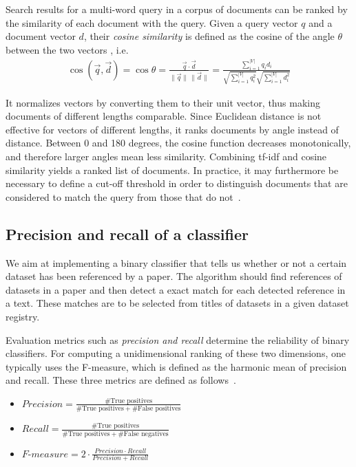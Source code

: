 \documentclass{IOS-Book-Article}
\begin{document}
Search results for a multi-word query in a corpus of documents can be ranked by the similarity of each document with the query.
Given a query vector $q$ and a document vector $d$, their \emph{cosine similarity} is defined as the cosine of the angle $\theta$ between the two vectors \citep{SALTON1988,ChristopherD1999}, i.e.\
\begin{align*}
  \cos(\overrightarrow{q},\overrightarrow{d})=\cos \theta=\frac{\overrightarrow{q}\cdot \overrightarrow{d}}{\|\overrightarrow{q}\|\,\|\overrightarrow{d}\|}=
  \frac{\sum_{i=1}^{|V|} q_id_i}{\sqrt{\sum_{i=1}^{|V|} q_i^2}\sqrt{\sum_{i=1}^{|V|} d_i^2}}
\end{align*}

It normalizes vectors by converting them to their unit vector, thus making documents of different lengths comparable.
Since Euclidean distance is not effective for vectors of different lengths, it ranks documents by angle instead of distance.
Between 0 and 180 degrees, the cosine function decreases monotonically, and therefore larger angles mean less similarity.
Combining tf-idf and cosine similarity yields a ranked list of documents.
In practice, it may furthermore be necessary to define a cut-off threshold in order to distinguish documents that are considered to match the query from those that do not~\citep{Joachims1997}.

\subsection{Precision and recall of a classifier}
\label{sec:precision-recall}
We aim at implementing a binary classifier that tells us whether or not a certain dataset has been referenced by a paper.
The algorithm should find references of datasets in a paper and then detect a exact match for each detected reference in a text.
These matches are to be selected from titles of datasets in a given dataset registry.

Evaluation metrics such as \emph{precision and recall} determine the reliability of binary classifiers.
For computing a unidimensional ranking of these two dimensions, one typically uses the F-measure, which is defined as the harmonic mean of precision and recall. 
These three metrics are defined as follows~\cite{Powers2011}. 
\begin{itemize}
	\item $\mathit{Precision}=\frac{\#\text{True\ positives}}{\#\text{True positives}+\#\text{False positives}}$
	\item $\mathit{Recall}=\frac{\#\text{True positives}}{\#\text{True positives}+\#\text{False negatives}}$
	\item $\textit{F-measure}=2\cdot{\frac{\mathit{Precision}\cdot\mathit{Recall}}{\mathit{Precision}+\mathit{Recall}}}$
\end{itemize}
\end{document}

